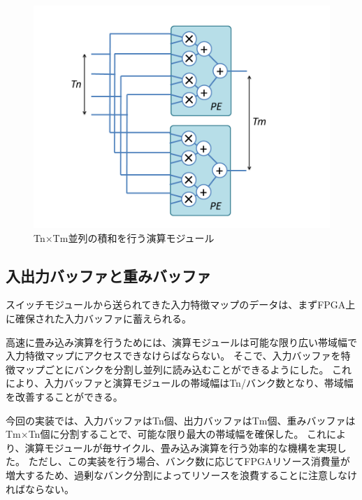 \begin{figure}[ht]  
 \begin{center}   
   \includegraphics[width=1.0\columnwidth, bb=0 0 720 540]{img/pe.png}
  \caption{Tn×Tm並列の積和を行う演算モジュール}
  \label{pe}  
 \end{center}  
\end{figure}

\subsection{入出力バッファと重みバッファ}
スイッチモジュールから送られてきた入力特徴マップのデータは、まずFPGA上に確保された入力バッファに蓄えられる。

高速に畳み込み演算を行うためには、演算モジュールは可能な限り広い帯域幅で入力特徴マップにアクセスできなけらばならない。
そこで、入力バッファを特徴マップごとにバンクを分割し並列に読み込むことができるようにした。
これにより、入力バッファと演算モジュールの帯域幅はTn/バンク数となり、帯域幅を改善することができる。

今回の実装では、入力バッファはTn個、出力バッファはTm個、重みバッファはTm×Tn個に分割することで、可能な限り最大の帯域幅を確保した。
これにより、演算モジュールが毎サイクル、畳み込み演算を行う効率的な機構を実現した。
ただし、この実装を行う場合、バンク数に応じてFPGAリソース消費量が増大するため、過剰なバンク分割によってリソースを浪費することに注意しなければならない。


